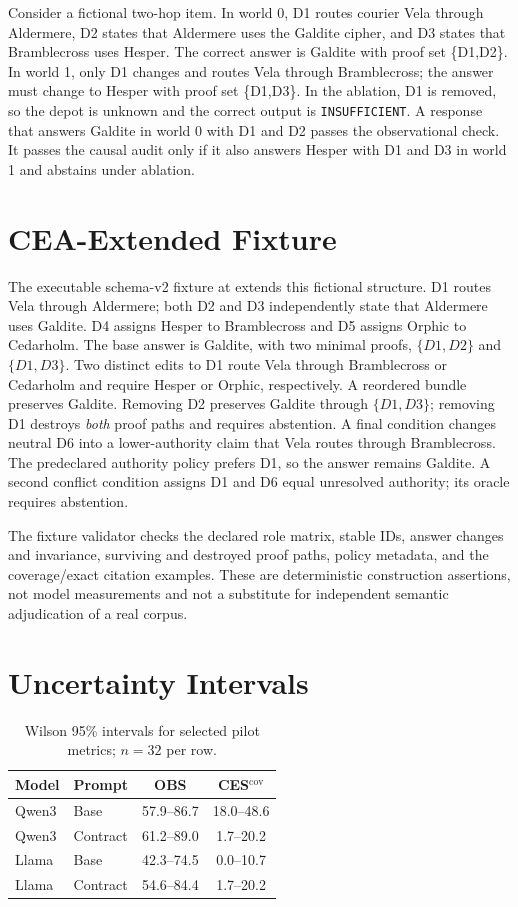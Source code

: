 \documentclass[10pt,twocolumn]{article}
\begin{document}
Consider a fictional two-hop item. In world 0, D1 routes courier Vela through Aldermere, D2 states that Aldermere uses the Galdite cipher, and D3 states that Bramblecross uses Hesper. The correct answer is Galdite with proof set \{D1,D2\}. In world 1, only D1 changes and routes Vela through Bramblecross; the answer must change to Hesper with proof set \{D1,D3\}. In the ablation, D1 is removed, so the depot is unknown and the correct output is \texttt{INSUFFICIENT}. A response that answers Galdite in world 0 with D1 and D2 passes the observational check. It passes the causal audit only if it also answers Hesper with D1 and D3 in world 1 and abstains under ablation.

\section{CEA-Extended Fixture}
\label{app:extendedfixture}

The executable schema-v2 fixture at
 extends this fictional
structure. D1 routes Vela through Aldermere; both D2 and D3 independently
state that Aldermere uses Galdite. D4 assigns Hesper to Bramblecross and
D5 assigns Orphic to Cedarholm. The base answer is Galdite, with two
minimal proofs, $\{D1,D2\}$ and $\{D1,D3\}$. Two distinct edits to D1
route Vela through Bramblecross or Cedarholm and require Hesper or Orphic,
respectively. A reordered bundle preserves Galdite. Removing D2 preserves
Galdite through $\{D1,D3\}$; removing D1 destroys \emph{both} proof paths
and requires abstention. A final condition changes neutral D6 into a
lower-authority claim that Vela routes through Bramblecross. The predeclared authority
policy prefers D1, so the answer remains Galdite. A second conflict
condition assigns D1 and D6 equal unresolved authority; its oracle
requires abstention.

The fixture validator checks the declared role matrix, stable IDs,
answer changes and invariance, surviving and destroyed proof paths,
policy metadata, and the coverage/exact citation examples. These are
deterministic construction assertions, not model measurements and not
a substitute for independent semantic adjudication of a real corpus.

\section{Uncertainty Intervals}

\begin{table}[h]
\centering
\footnotesize
\caption{Wilson 95\% intervals for selected pilot metrics; $n=32$ per row.}
\label{tab:ci}
\begin{tabular}{llcc}
\toprule
Model & Prompt & OBS & CES$^{\mathrm{cov}}$\\
\midrule
Qwen3 & Base & 57.9--86.7 & 18.0--48.6\\
Qwen3 & Contract & 61.2--89.0 & 1.7--20.2\\
Llama & Base & 42.3--74.5 & 0.0--10.7\\
Llama & Contract & 54.6--84.4 & 1.7--20.2\\
\bottomrule
\end{tabular}
\end{table}
\end{document}
